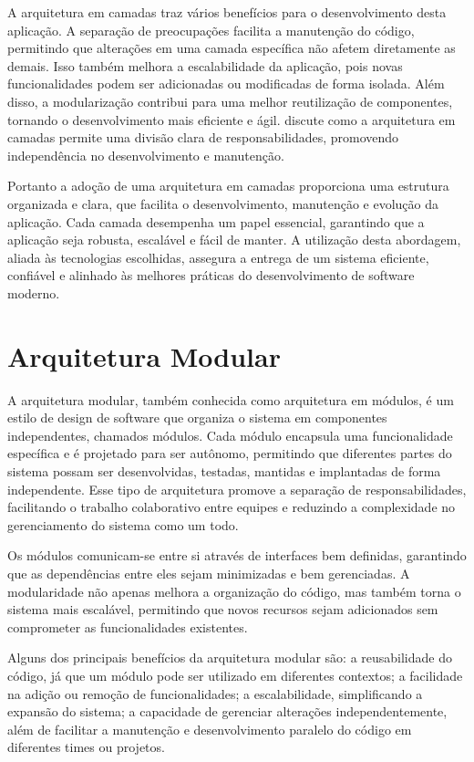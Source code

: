 A arquitetura em camadas traz vários benefícios para o desenvolvimento desta aplicação. A separação de preocupações facilita a manutenção do código, permitindo que alterações em uma camada específica não afetem diretamente as demais. Isso também melhora a escalabilidade da aplicação, pois novas funcionalidades podem ser adicionadas ou modificadas de forma isolada. Além disso, a modularização contribui para uma melhor reutilização de componentes, tornando o desenvolvimento mais eficiente e ágil. \cite{Martin17} discute como a arquitetura em camadas permite uma divisão clara de responsabilidades, promovendo independência no desenvolvimento e manutenção.

Portanto a adoção de uma arquitetura em camadas proporciona uma estrutura organizada e clara, que facilita o desenvolvimento, manutenção e evolução da aplicação. Cada camada desempenha um papel essencial, garantindo que a aplicação seja robusta, escalável e fácil de manter. A utilização desta abordagem, aliada às tecnologias escolhidas, assegura a entrega de um sistema eficiente, confiável e alinhado às melhores práticas do desenvolvimento de software moderno.

\section{Arquitetura Modular}

A arquitetura modular, também conhecida como arquitetura em módulos, é um estilo de design de software que organiza o sistema em componentes independentes, chamados módulos. Cada módulo encapsula uma funcionalidade específica e é projetado para ser autônomo, permitindo que diferentes partes do sistema possam ser desenvolvidas, testadas, mantidas e implantadas de forma independente. Esse tipo de arquitetura promove a separação de responsabilidades, facilitando o trabalho colaborativo entre equipes e reduzindo a complexidade no gerenciamento do sistema como um todo.

Os módulos comunicam-se entre si através de interfaces bem definidas, garantindo que as dependências entre eles sejam minimizadas e bem gerenciadas. A modularidade não apenas melhora a organização do código, mas também torna o sistema mais escalável, permitindo que novos recursos sejam adicionados sem comprometer as funcionalidades existentes.

Alguns dos principais benefícios da arquitetura modular são: a reusabilidade do código, já que um módulo pode ser utilizado em diferentes contextos; a facilidade na adição ou remoção de funcionalidades; a escalabilidade, simplificando a expansão do sistema; a capacidade de gerenciar alterações independentemente, além de facilitar a manutenção e desenvolvimento paralelo do código em diferentes times ou projetos.

